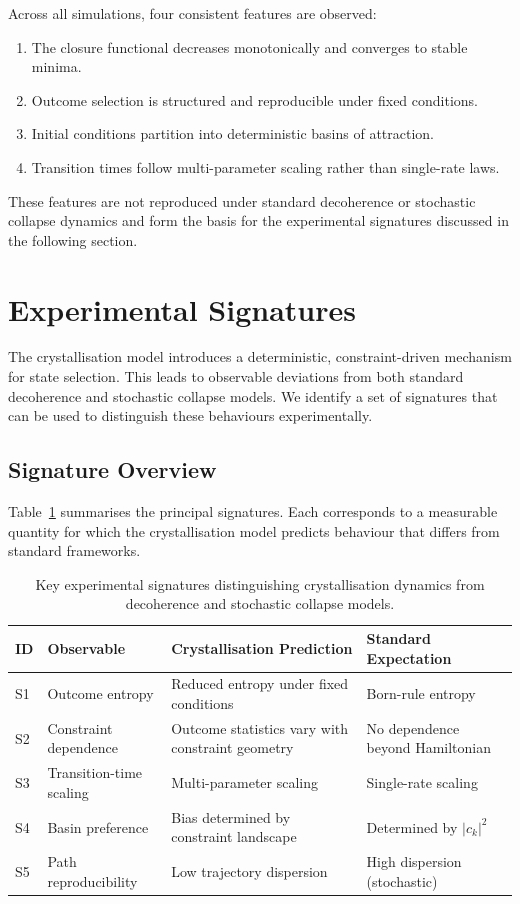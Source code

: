 \documentclass[12pt]{article}
\begin{document}
Across all simulations, four consistent features are observed:
\begin{enumerate}
\item The closure functional decreases monotonically and converges to stable minima.
\item Outcome selection is structured and reproducible under fixed conditions.
\item Initial conditions partition into deterministic basins of attraction.
\item Transition times follow multi-parameter scaling rather than single-rate laws.
\end{enumerate}
These features are not reproduced under standard decoherence or stochastic collapse dynamics and form the basis for the experimental signatures discussed in the following section.

\section{Experimental Signatures}

The crystallisation model introduces a deterministic, constraint-driven mechanism for state selection. This leads to observable deviations from both standard decoherence and stochastic collapse models. We identify a set of signatures that can be used to distinguish these behaviours experimentally.

\subsection{Signature Overview}

Table~\ref{tab:signatures} summarises the principal signatures. Each corresponds to a measurable quantity for which the crystallisation model predicts behaviour that differs from standard frameworks.

\begin{table}[ht]
\centering
\small
\caption{Key experimental signatures distinguishing crystallisation dynamics from decoherence and stochastic collapse models.}
\label{tab:signatures}
\begin{tabular}{@{}llp{3.5cm}p{3.5cm}@{}}
\toprule
ID & Observable & Crystallisation Prediction & Standard Expectation \\
\midrule
S1 & Outcome entropy & Reduced entropy under fixed conditions & Born-rule entropy \\
S2 & Constraint dependence & Outcome statistics vary with constraint geometry & No dependence beyond Hamiltonian \\
S3 & Transition-time scaling & Multi-parameter scaling & Single-rate scaling \\
S4 & Basin preference & Bias determined by constraint landscape & Determined by $|c_k|^2$ \\
S5 & Path reproducibility & Low trajectory dispersion & High dispersion (stochastic) \\
\bottomrule
\end{tabular}
\end{table}
\end{document}
